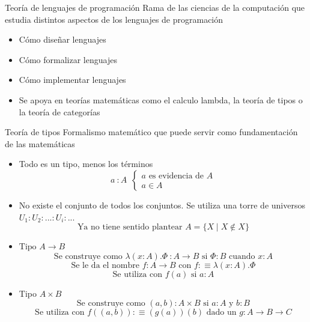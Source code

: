 \documentclass[compress]{beamer}
\begin{document}
\begin{frame}{Teoría de lenguajes de programación}
	Rama de las ciencias de la computación que estudia distintos aspectos de los lenguajes de programación\\
	\bigskip
	
	\begin{itemize}

		\item Cómo diseñar lenguajes\\
		\bigskip
		\item Cómo formalizar lenguajes\\
		\bigskip
		\item Cómo implementar lenguajes\\
		\bigskip
		\item Se apoya en teorías matemáticas como el calculo lambda, la teoría de tipos o la teoría de categorías\\
	\end{itemize}
	\bigskip
\end{frame}


\begin{frame}{Teoría de tipos}
	Formalismo matemático que puede servir como fundamentación de las matemáticas\\
	\bigskip
	\begin{itemize}
		\item Todo es un tipo, menos los términos
		\[a\ \colon A\ \ 
		\begin{cases} 
		a \text{ es evidencia de } A
\\
		a \in A
		\end{cases}
		\]
		
		\item No existe el conjunto de todos los conjuntos. Se utiliza una torre de universos $U_1 : U_2 : ... : U_i : ...$\\
		
		$$\text{Ya no tiene sentido plantear } A = \{X \mid X \notin X\}$$
		
	\end{itemize}
	\bigskip
\end{frame}


\begin{frame}
	\begin{itemize}
		\item $\text{Tipo } A \to B$\\
		
		$$\text{Se construye como } \lambda(x:A).\Phi\ :A \to B \text{ si } \Phi:B \text{ cuando } x:A$$
		$$\text{Se le da el nombre } f:A \to B \text{ con } f :\equiv \lambda(x:A).\Phi$$
		$$\text{Se utiliza con } f(a) \text{ si } a:A$$
		\smallskip
		
		\item Tipo $A \times B$\\
		
		$$\text{Se construye como } (a, b):A \times B \text{ si } a:A \text{ y } b:B$$
		$$\text{Se utiliza con } f((a, b)) :\equiv (g(a))(b) \text{ dado un } g:A \to B \to C$$
	\end{itemize}
\end{frame}
\end{document}
